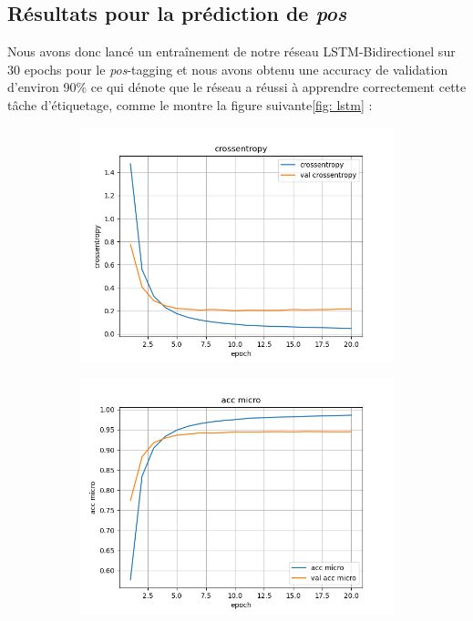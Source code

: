 \documentclass[a4paper]{article}
\begin{document}
\subsection{Résultats pour la prédiction de \textit{pos}}
Nous avons donc lancé un entraînement de notre réseau LSTM-Bidirectionel sur 30 epochs pour le \textit{pos}-tagging et 
nous avons obtenu une accuracy de validation d'environ 90\% ce qui dénote que le réseau a réussi à apprendre 
correctement cette tâche d'étiquetage, comme le montre la figure suivante\ref{fig: lstm} :

\begin{figure}[H]
    \centering
    \begin{subfigure}{0.32\textwidth}
        \centering
        \includegraphics[width=\linewidth]{../logs/get_pos/crossentropy.png}
    \end{subfigure}
    \begin{subfigure}{0.32\textwidth}
        \centering
        \includegraphics[width=\linewidth]{../logs/get_pos/acc micro.png}

\end{subfigure}
\end{figure}
\end{document}
